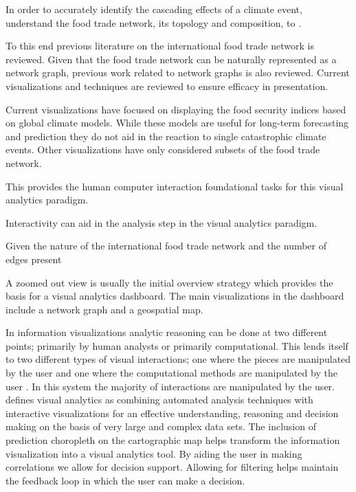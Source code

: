 In order to accurately identify the cascading effects of a climate event, understand the food trade network, its topology and composition, to .\par
To this end previous literature on the international food trade network is reviewed. Given that the food trade network can be naturally represented as a network graph, previous work related to network graphs is also reviewed. Current visualizations and techniques are reviewed to ensure efficacy in presentation.\par
Current visualizations have focused on displaying the food security indices based on global climate models. While these models are useful for long-term forecasting and prediction they do not aid in the reaction to single catastrophic climate events. Other visualizations have only considered subsets of the food trade network.






This provides the human computer interaction foundational tasks for this visual analytics paradigm. 





Interactivity can aid in the analysis step in the visual analytics paradigm. 



Given the nature of the international food trade network and the number of edges present





A zoomed out view is usually the initial overview strategy which provides the basis for a visual analytics dashboard. The main visualizations in the dashboard include a network graph and a geospatial map.\par

In information visualizations analytic reasoning can be done at two different points; primarily by human analysts or primarily computational. This lends itself to two different types of visual interactions; one where the pieces are manipulated by the user and one where the computational methods are manipulated by the user \citep{andrienko2011challenging}. In this system the majority of interactions are manipulated by the user. \cite{keim2008visual} defines visual analytics as combining automated analysis techniques with interactive visualizations for an effective understanding, reasoning and decision making on the basis of very large and complex data sets. The inclusion of prediction choropleth on the cartographic map helps transform the information visualization into a visual analytics tool. By aiding the user in making correlations we allow for decision support. Allowing for filtering helps maintain the feedback loop \citep{keim2008visual} in which the user can make a decision.\par

